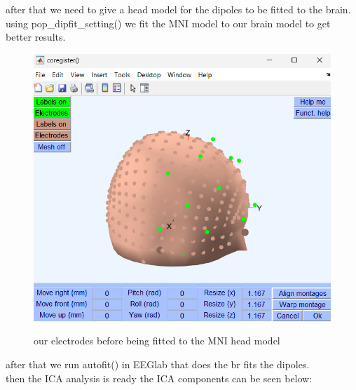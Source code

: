 \documentclass[11pt]{article}
\begin{document}
after that we need to give a head model for the dipoles to be fitted to the brain.
using pop\_dipfit\_setting() we fit the MNI model to our brain model to get better results. \\
\begin{figure}[H]
    \begin{center}
        \includegraphics[scale=0.7]{Fig/dipole_fit_coreg_data1.png}
        \label{fig:headmodel}
        \caption{our electrodes before being fitted to the MNI head model}
    \end{center}
\end{figure}

after that we run autofit() in EEGlab that does the br fits the dipoles. \\
then the ICA analysis is ready the ICA components can be seen below: \\
\end{document}
